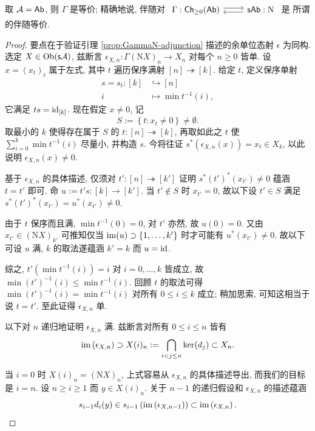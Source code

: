 \begin{lemma}\label{prop:DK-Ab}
	取 $\mathcal{A} = \mathsf{Ab}$, 则 $\Gamma$ 是等价; 精确地说, 伴随对
	$\begin{tikzcd}
		\Gamma: \cate{Ch}_{\geq 0}(\cate{Ab}) \arrow[shift left, r] & \cate{s}\cate{Ab} : \mathrm{N} \arrow[shift left, l]
	\end{tikzcd}$
	是 \cite[定理 2.6.12]{Li1} 所谓的伴随等价.
\end{lemma}
\begin{proof}
	要点在于验证引理 \ref{prop:GammaN-adjunction} 描述的余单位态射 $\epsilon$ 为同构. 选定 $X \in \operatorname{Ob}(\mathsf{s}\mathcal{A})$, 兹断言 $\epsilon_{X, n}: \Gamma (\mathrm{N}X)_n \to X_n$ 对每个 $n \geq 0$ 皆单. 设 $x = (x_t)_t$ 属于左式, 其中 $t$ 遍历保序满射 $[n] \twoheadrightarrow [k]$. 给定 $t$, 定义保序单射
	\begin{align*}
		s = s_t : [k] & \hookrightarrow [n] \\
		i & \mapsto \min t^{-1}(i) ,
	\end{align*}
	它满足 $ts = \mathrm{id}_{[k]}$. 现在假定 $x \neq 0$, 记
	\[ S := \left\{t: x_t \neq 0 \right\} \neq \emptyset. \]
	取最小的 $k$ 使得存在属于 $S$ 的 $t: [n] \twoheadrightarrow [k]$, 再取如此之 $t$ 使 $\sum_{i=0}^k \min t^{-1}(i)$ 尽量小, 并构造 $s$. 今将往证 $s^*(\epsilon_{X, n}(x)) = x_t \in X_k$, 以此说明 $\epsilon_{X, n}(x) \neq 0$.
	
	基于 $\epsilon_{X, n}$ 的具体描述, 仅须对 $t': [n] \twoheadrightarrow [k']$ 证明 $s^* (t')^*(x_{t'}) \neq 0$ 蕴涵 $t = t'$ 即可. 命 $u := t's: [k] \to [k']$. 当 $t' \notin S$ 时 $x_{t'} = 0$, 故以下设 $t' \in S$ 满足 $s^* (t')^*(x_{t'}) = u^* (x_{t'}) \neq 0$.
	
	由于 $t$ 保序而且满, $\min t^{-1}(0) = 0$, 对 $t'$ 亦然, 故 $u(0) = 0$. 又由 $x_{t'} \in (\mathrm{N}X)_{k'}$ 可推知仅当 $\operatorname{im}(u) \supset \{1, \ldots, k'\}$ 时才可能有 $u^* (x_{t'}) \neq 0$. 故以下可设 $u$ 满, $k$ 的取法遂蕴涵 $k' = k$ 而 $u = \mathrm{id}$.
	
	综之, $t'\left( \min t^{-1}(i) \right) = i$ 对 $i = 0, \ldots, k$ 皆成立, 故 $\min (t')^{-1}(i) \leq \min t^{-1}(i)$. 回顾 $t$ 的取法可得 $\min (t')^{-1}(i) = \min t^{-1}(i)$ 对所有 $0 \leq i \leq k$ 成立; 稍加思索, 可知这相当于说 $t = t'$. 至此证得 $\epsilon_{X, n}$ 单.
	
	以下对 $n$ 递归地证明 $\epsilon_{X, n}$ 满. 兹断言对所有 $0 \leq i \leq n$ 皆有
	\[ \operatorname{im}\left( \epsilon_{X, n} \right) \supset X(i)_n := \bigcap_{i < j \leq n} \operatorname{ker}(d_j) \subset X_n. \]
	
	当 $i = 0$ 时 $X(i)_n = (\mathrm{N}X)_n$, 上式容易从 $\epsilon_{X, n}$ 的具体描述导出, 而我们的目标是 $i=n$. 设 $n \geq i \geq 1$ 而 $y \in X(i)_n$. 关于 $n-1$ 的递归假设和 $\epsilon_{X, n}$ 的描述蕴涵
	\[ s_{i-1} d_i(y) \in s_{i-1}\left( \operatorname{im}\left(\epsilon_{X, n-1}\right) \right) \subset \operatorname{im}\left( \epsilon_{X, n} \right). \]


\end{proof}
